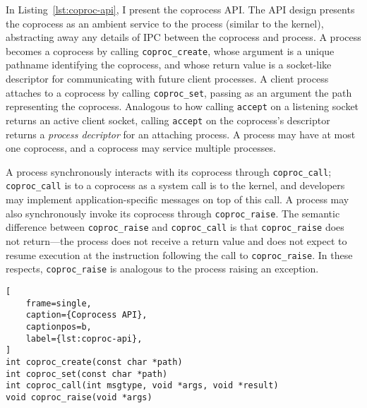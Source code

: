 %
In Listing~\ref{lst:coproc-api}, I present the coprocess API\@.
%
The API design presents the coprocess as an ambient service to the process
(similar to the kernel), abstracting away any details of IPC between the
coprocess and process.
%
A process becomes a coprocess by calling \texttt{coproc\_create}, whose
argument is a unique pathname identifying the coprocess, and whose return value
is a socket-like descriptor for communicating with future client processes.
%
A client process attaches to a coprocess by calling \texttt{coproc\_set}, passing as an
argument the path representing the coprocess.
%
Analogous to how calling \texttt{accept} on a listening socket returns an
active client socket, calling \texttt{accept} on the coprocess's descriptor
returns a \emph{process decriptor} for an attaching process.
%
A process may have at most one coprocess, and a coprocess may service multiple
processes.
%


A process synchronously interacts with its coprocess through
\texttt{coproc\_call}; \texttt{coproc\_call} is to a coprocess as a system call
is to the kernel, and developers may implement application-specific messages
on top of this call.
%
A process may also synchronously invoke its coprocess through
\texttt{coproc\_raise}.
%
The semantic difference between \texttt{coproc\_raise} and
\texttt{coproc\_call} is that \texttt{coproc\_raise} does not return---the
process does not receive a return value and does not expect to resume
execution at the instruction following the call to \texttt{coproc\_raise}.
%
In these respects, \texttt{coproc\_raise} is analogous to the process raising
an exception.

\begin{lstlisting}[
    frame=single, 
    caption={Coprocess API},
    captionpos=b,
    label={lst:coproc-api},
]
int coproc_create(const char *path)
int coproc_set(const char *path)
int coproc_call(int msgtype, void *args, void *result)
void coproc_raise(void *args)
\end{lstlisting}


%


